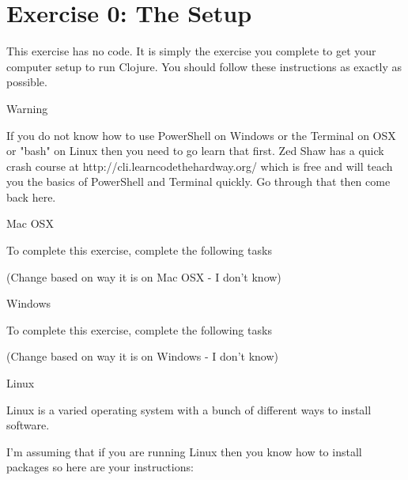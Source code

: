 \chapter{Exercise 0: The Setup}

This exercise has no code.  It is simply the exercise you complete	
to get your computer setup to run Clojure. You should follow these instructions
as exactly as possible.
	
	
\begin{aside}{Warning}

    If you do not know how to use PowerShell on Windows or the Terminal on
    OSX or "bash" on Linux then you need to go learn that first.  Zed Shaw has
    a quick crash course at http://cli.learncodethehardway.org/ which is free
    and will teach you the basics of PowerShell and Terminal quickly. Go
    through that then come back here.

\end{aside}
	
{\Large Mac OSX}

To complete this exercise, complete the following tasks

(Change based on way it is on Mac OSX - I don't know)

{\Large Windows}

To complete this exercise, complete the following tasks

(Change based on way it is on Windows - I don't know)	
	
{\Large Linux}
	
Linux is a varied operating system with a bunch of different ways to install software.
	
I'm assuming that if you are running Linux then you know how to install packages so here are your instructions:
	
